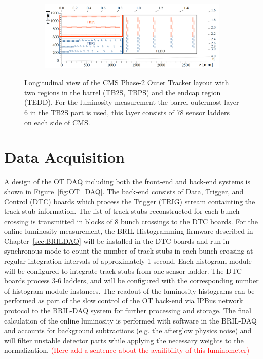 \begin{figure}[h!]
\centering
\begin{subfigure}
\centering
\includegraphics[width=.95\linewidth]{tex/Part2/fig/OT/OT-longitudinal.png}
\end{subfigure}
\caption{
  Longitudinal view of the CMS Phase-2 Outer Tracker layout  with two regions in the barrel (TB2S, TBPS) and the endcap region (TEDD).
  For the luminosity measurement the barrel outermost layer 6 in the TB2S part is used, this layer consists of 78 sensor ladders on each side of CMS.
}
\label{fig:OT_layout}
\end{figure}




\section{Data Acquisition}

A design of the OT DAQ including both the front-end and back-end systems is shown in Figure~\ref{fig:OT_DAQ}.
The back-end consists of Data, Trigger, and Control (DTC) boards which process the Trigger (TRIG) stream containting the track stub information. 
The list of track stubs reconstructed for each bunch crossing is transmitted in blocks of 8 bunch crossings to the DTC boards.
For the online luminosity measurement, the BRIL Histogramming firmware described in Chapter~\ref{sec:BRILDAQ}
will be installed in the DTC boards and run in synchronous mode
to count the number of track stubs in each bunch crossing  at regular integration intervals of approximately 1 second.
Each histogram module will be configured to integrate track stubs from one  sensor ladder.
The DTC boards process 3-6 ladders, and will be configured with the corresponding number of histogram module instances.
The readout of the luminosity histograms can be performed as part of the slow control of the OT back-end via IPBus network protocol
to the BRIL-DAQ system for further processing and storage.
The final calculation of the online luminosity is performed with software in the BRIL-DAQ and accounts for background subtractions (e.g. the afterglow physics noise)
and will filter unstable detector parts while applying the necessary weights to the normalization.
\textcolor{red}{(Here add a sentence about the availibility of this luminometer)}

